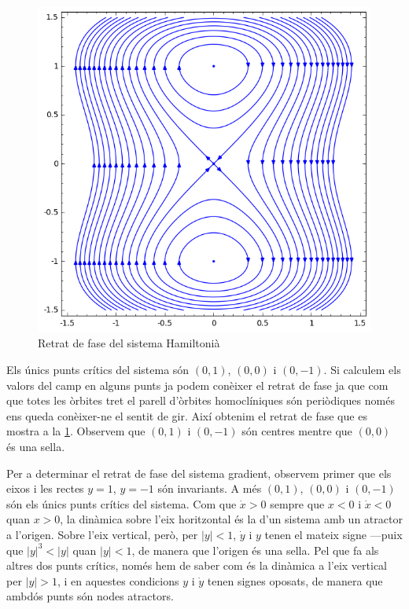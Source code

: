 \documentclass[12pt]{report}
\numberwithin{table}{section}
\numberwithin{equation}{section}
\numberwithin{figure}{section}
\newcommand{\abs}[1]{\lvert #1 \rvert}
\begin{document}
\begin{enumerate}[label=(\roman*), font=\bfseries \sffamily, wide, labelwidth=!, labelindent=0pt]
		\begin{figure}[htb]
			\centering \sffamily \small
			\includegraphics[scale = 0.7]{retrat-hamiltonia}
			\caption{Retrat de fase del sistema Hamiltonià}
			\label{fig:retrat de fase hamiltonia}
		\end{figure}

		Els únics punts crítics del sistema són \( (0,1) \), \( (0,0) \) i \( (0, -1) \). Si calculem els valors del camp en alguns punts ja podem conèixer el retrat de fase ja que com que totes les òrbites tret el parell d'òrbites homoclíniques són periòdiques només ens queda conèixer-ne el sentit de gir. Així obtenim el retrat de fase que es mostra a la \cref{fig:retrat de fase hamiltonia}. Observem que \( (0,1) \) i \( (0, -1) \) són centres mentre que \( (0,0) \) és una sella. 

		Per a determinar el retrat de fase del sistema gradient, observem primer que els eixos i les rectes \( y = 1 \), \( y = -1 \) són invariants. A més \( (0,1) \), \( (0,0) \) i \( (0, -1) \) són els únics punts crítics del sistema. Com que \( \dot{x} > 0 \) sempre que \( x < 0 \) i \( \dot{x} < 0 \) quan \( x > 0 \), la dinàmica sobre l'eix horitzontal és la d'un sistema amb un atractor a l'origen. Sobre l'eix vertical, però, per \( \abs{y} < 1 \), \( \dot{y} \) i \( y \) tenen el mateix signe ---puix que \( \abs{y}^3 < \abs{y} \) quan \( \abs{y} < 1 \), de manera que l'origen és una sella. Pel que fa als altres dos punts crítics, només hem de saber com és la dinàmica a l'eix vertical per \( \abs{y} > 1 \), i en aquestes condicions \( y \) i \( \dot{y} \) tenen signes oposats, de manera que ambdós punts són nodes atractors. 


\end{enumerate}
\end{document}
